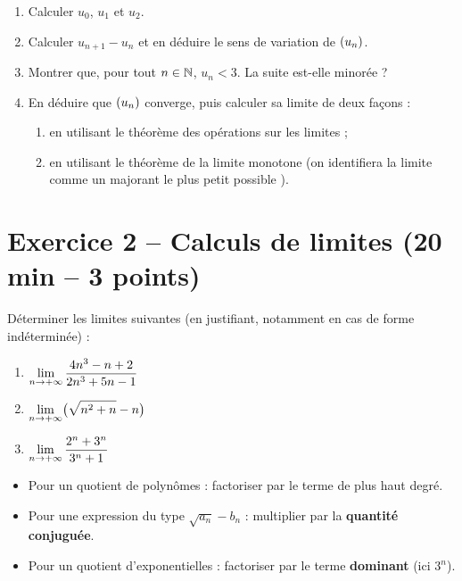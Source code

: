 \documentclass[11pt,a4paper]{article}
\begin{document}
\begin{enumerate}
  \item Calculer $u_0$, $u_1$ et $u_2$.
  \item Calculer $u_{n+1}-u_n$ et en déduire le sens de variation de $(u_n)$.
  \item Montrer que, pour tout $n\in\mathbb{N}$, $u_n < 3$. La suite est-elle minorée ?
  \item En déduire que $(u_n)$ converge, puis calculer sa limite de deux façons :
  \begin{enumerate}
    \item en utilisant le théorème des opérations sur les limites ;
    \item en utilisant le théorème de la limite monotone (on identifiera la limite comme un majorant \og le plus petit possible \fg{}).
  \end{enumerate}
\end{enumerate}

\section*{Exercice 2 -- Calculs de limites \hfill {\normalsize\normalfont (20 min -- 3 points)}}

Déterminer les limites suivantes (en justifiant, notamment en cas de forme indéterminée) :

\begin{enumerate}
  \item $\displaystyle\lim_{n\to +\infty} \dfrac{4n^3 - n + 2}{2n^3 + 5n - 1}$
  \item $\displaystyle\lim_{n\to +\infty} \bigl(\sqrt{n^2 + n} - n\bigr)$
  \item $\displaystyle\lim_{n\to +\infty} \dfrac{2^n + 3^n}{3^n + 1}$
\end{enumerate}

\begin{methodebox}
\begin{itemize}
  \item Pour un quotient de polynômes : factoriser par le terme de plus haut degré.
  \item Pour une expression du type $\sqrt{a_n}-b_n$ : multiplier par la \textbf{quantité conjuguée}.
  \item Pour un quotient d'exponentielles : factoriser par le terme \textbf{dominant} (ici $3^n$).
\end{itemize}
\end{methodebox}
\end{document}
